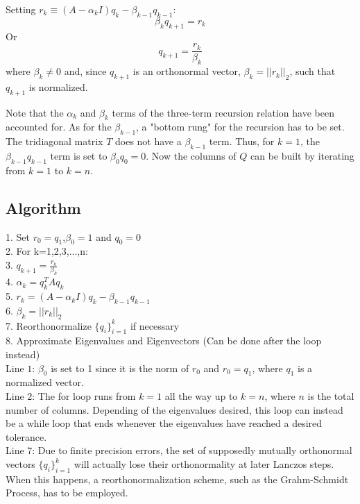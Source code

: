 Setting $r_k \equiv (A-\alpha_k I) q_k - \beta_{k-1} q_{k-1}$:
%
\begin{equation}
\beta_{k} q_{k+1} = r_{k}
\end{equation}
%
Or
%
 \begin{equation}
q_{k+1} = \frac{r_k}{\beta_{k}}
\end{equation}
%
where $\beta_{k} \neq 0$ and, since $q_{k+1}$ is an orthonormal vector, $\beta_{k} = || r_k ||_2$, such that $q_{k+1}$ is normalized.

Note that the $\alpha_k$ and $\beta_k$ terms of the three-term recursion relation have been accounted for. As for the $\beta_{k-1}$, a "bottom rung" for the recursion has to be set. The tridiagonal matrix $T$ does not have a $\beta_{k-1}$ term. Thus, for $k=1$, the $\beta_{k-1} q_{k-1}$ term is set to $\beta_{0} q_{0} = 0$. Now the columns of $Q$ can be built by iterating from $k=1$ to $k=n$.

\subsection{Algorithm}

 1. Set $r_0=q_1$,$\beta_0=1$ and $q_0 = 0$ \\
  2. For k=1,2,3,...,n: \\
  3.     $q_{k+1} = \frac{r_k}{\beta_{k}}$ \\
  4.     $\alpha_k = q_k^T A q_k$ \\
  5.     $r_k = (A - \alpha_k I)q_k - \beta_{k-1}q_{k-1}$ \\
  6.     $\beta_k = ||r_k||_2$ \\
  7.     Reorthonormalize $\lbrace q_i \rbrace_{i=1}^{k}$ if necessary \\
  8.     Approximate Eigenvalues and Eigenvectors (Can be done after the loop instead) \\

Line $1$: $\beta_0$ is set to 1 since it is the norm of $r_0$ and $r_0 = q_1$, where $q_1$ is a normalized vector. \\

Line $2$: The for loop runs from $k=1$ all the way up to $k=n$, where $n$ is the total number of columns. Depending of the eigenvalues desired, this loop can instead be a while loop that ends whenever the eigenvalues have reached a desired tolerance. \\

Line $7$: Due to finite precision errors, the set of supposedly mutually orthonormal vectors $\lbrace q_i \rbrace_{i=1}^{k}$ will actually lose their orthonormality at later Lanczos steps. When this happens, a reorthonormalization scheme, such as the Grahm-Schmidt Process, has to be employed. \\


